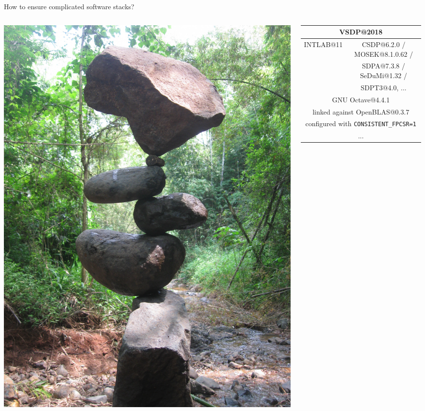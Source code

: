 \documentclass[xcolor=svgnames,xcolor=table,aspectratio=169]{beamer}
\begin{document}
\begin{frame}{How to ensure complicated software stacks?}
\begin{columns}
\begin{column}{.3\textwidth}
\includegraphics[width=\textwidth]{res/rock_balancing.jpg}
\end{column}
\begin{column}{.65\textwidth}
\begin{center}
\begin{tabular}{|c|c|}
\hline
\multicolumn{2}{|c|}{VSDP{\color{red}@2018}} \\
\hline
\multirow{3}{*}{INTLAB{\color{red}@11}}
& CSDP{\color{red}@6.2.0} / MOSEK{\color{red}@8.1.0.62} / \\
& SDPA{\color{red}@7.3.8} / SeDuMi{\color{red}@1.32} / \\
& SDPT3{\color{red}@4.0}, ... \\
\hline
\multicolumn{2}{|c|}{GNU Octave{\color{red}@4.4.1}} \\
\multicolumn{2}{|c|}{{\color{blue}linked against}
OpenBLAS{\color{red}@0.3.7}} \\
\multicolumn{2}{|c|}{{\color{blue}configured with}
{\color{DarkGreen}\texttt{CONSISTENT\_FPCSR=1}}} \\
\multicolumn{2}{|c|}{...} \\
\hline
\end{tabular}
\end{center}


\end{column}
\end{columns}
\end{frame}
\end{document}
